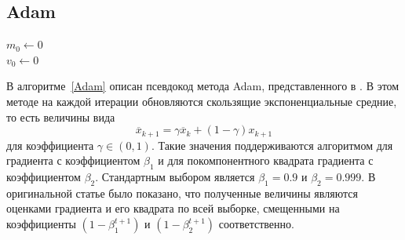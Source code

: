 \documentclass[preprint,12pt]{elsarticle}
\begin{document}
\subsection{Adam}
\begin{algorithm}[H]\label{Adam}
\caption {Adam все операции с векторами покомпонентные;\newline$\beta_i^{t+1}$ обозначает возведение числа $\beta_i$ в степень $t + 1$, $i \in \{1, 2\}$.}
\SetAlgoLined
\Input{Число итераций $N$ \newline
        Размер шага $\eta$ \newline
        Экспоненциальные скорости затухания $\beta_1, \beta_2 \in [0, 1)$ \newline
        Начальное приближение $\theta_0$ \newline
        Поправка на численную неустойчивость $\varepsilon$}
 $m_0 \leftarrow 0$\\
 $v_0 \leftarrow 0$\\
\end{algorithm}
В алгоритме~\ref{Adam} описан псевдокод метода Adam, представленного в \cite{adam}. 
В этом методе на каждой итерации обновляются скользящие экспоненциальные средние, то есть величины вида
\[
    \overline{x}_{k+1} = \gamma\overline{x}_k + (1 - \gamma)x_{k+1}
\]
для коэффициента $\gamma \in (0, 1)$. 
Такие значения поддерживаются алгоритмом для градиента с коэффициентом $\beta_1$ и для покомпонентного квадрата градиента с коэффициентом $\beta_2$. 
Стандартным выбором является $\beta_1 = 0.9$ и $\beta_2 = 0.999$. 
В оригинальной статье было показано, что полученные величины являются оценками градиента и его квадрата по всей выборке, смещенными на коэффициенты $(1 - \beta_1^{t+1})$ и $(1 - \beta_2^{t+1})$ соответственно. 
\end{document}
